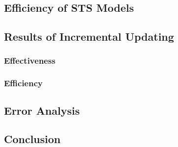 \subsection{Efficiency of STS Models}
\label{sec:5.3}

\subsection{Results of Incremental Updating}
\label{sec:5.4}

\subsubsection{Effectiveness}

\subsubsection{Efficiency}

\subsection{Error Analysis}
\label{sec:5.5}

\subsection{Conclusion}
\label{sec:5.6}
